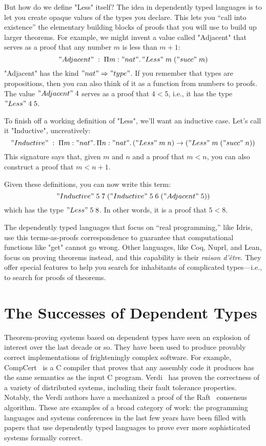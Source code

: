 But how do we define "Less" itself?
The idea in dependently typed languages is to let you create opaque values of
the types you declare.
This lets you ``call into existence'' the elementary building blocks of proofs
that you will use to build up larger theorems.
For example, we might invent a value called "Adjacent" that serves as a proof
that any number $m$ is less than $m+1$:
%
\[
"Adjacent" \;:\;
\Pi m : "nat". \,
"Less" \; m \; ("succ" \; m)
\]
%
"Adjacent" has the kind $"nat" \Rightarrow "type"$.
If you remember that types are propositions, then you can also think of it as
a function from numbers to proofs.
The value $"Adjacent" \; 4$ serves as a proof that $4 < 5$,
i.e., it has the type $"Less" \; 4 \; 5$.

To finish off a working definition of "Less", we'll want an inductive case.
Let's call it "Inductive", uncreatively:
%
\[
"Inductive" \;:\;
\Pi m : "nat". \,
\Pi n : "nat". \,
("Less" \; m \; n) \to
("Less" \; m \; ("succ" \; n))
\]
%
This signature says that, given $m$ and $n$ and a proof that $m < n$, you can
also construct a proof that $m < n+1$.

Given these definitions, you can now write this term:
%
\[
"Inductive" \; 5 \; 7 \; ("Inductive" \; 5 \; 6 \; ("Adjacent" \; 5))
\]
%
which has the type $"Less" \; 5 \; 8$.
In other words, it is a proof that $5 < 8$.

The dependently typed languages that focus on ``real programming,'' like
Idris, use this terms-as-proofs correspondence to guarantee that computational
functions like "get" cannot go wrong.
Other languages, like Coq, Nuprl, and Lean, focus on proving theorems instead,
and this capability is their \emph{raison d'\^{e}tre}.
They offer special features to help you search for inhabitants of complicated
types---i.e., to search for proofs of theorems.


\section{The Successes of Dependent Types}

Theorem-proving systems based on dependent types have seen an explosion of
interest over the last decade or so.
They have been used to produce provably correct implementations of
frighteningly complex software.
For example, CompCert~\cite{compcert} is a C compiler that proves that any
assembly code it produces has the same semantics as the input C program.
Verdi~\cite{verdi} has proven the correctness of a variety of distributed
systems, including their fault tolerance properties.
Notably, the Verdi authors have a mechanized a proof of the Raft~\cite{raft}
consensus algorithm.
These are examples of a broad category of work: the programming languages and
systems conferences in the last few years have been filled with papers that
use dependently typed languages to prove ever more sophisticated systems
formally correct.
